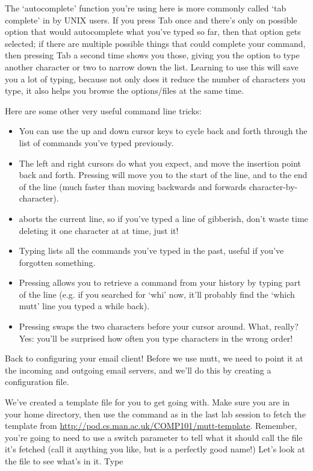 The `autocomplete' function you're using here is more commonly called `tab complete' in by UNIX users. If you press Tab once and there's only on possible option that would autocomplete what you've typed so far, then that option gets selected; if there are multiple possible things that could complete your command, then pressing Tab a second time shows you those, giving you the option to type another character or two to narrow down the list. Learning to use this will save you a lot of typing, because not only does it reduce the number of characters you type, it also helps you browse the options/files at the same time. 

Here are some other very useful command line tricks:

\begin{itemize}
\item You can use the up and down cursor keys to cycle back and forth through the list of commands you've typed previously.
\item The left and right cursors do what you expect, and move the insertion point back and forth. Pressing  will move you to the start of the line, and  to the end of the line (much faster than moving backwards and forwards character-by-character). 
\item {} aborts the current line, so if you've typed a line of gibberish, don't waste time deleting it one character at at time, just  it!
\item Typing  lists all the commands you've typed in the past, useful if you've forgotten something.
\item Pressing  allows you to retrieve a command from your history by typing part of the line (e.g. if you searched for `whi' now, it'll probably find the `which mutt' line you typed a while back). 
\item Pressing  swaps the two characters before your cursor around. What, really? Yes: you'll be surprised how often you type characters in the wrong order! 
\end{itemize}

Back to configuring your email client! Before we use mutt, we need to point it at the incoming and outgoing email servers, and we'll do this by creating a configuration file.

We've created a template file for you to get going with. Make sure you are in your home directory, then use the  command as in the last lab session to fetch the template from \url{http://pod.cs.man.ac.uk/COMP101/mutt-template}. Remember, you're going to need to use a switch parameter to tell  what it should call the file it's fetched (call it anything you like, but  is a perfectly good name!) Let's look at the file to see what's in it. Type

